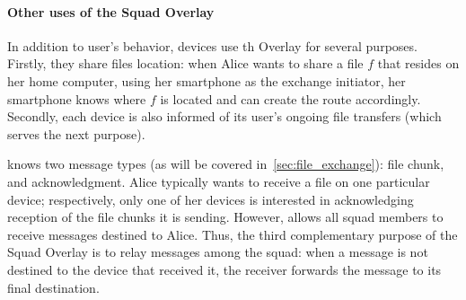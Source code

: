 


\paragraph*{Other uses of the Squad Overlay} In addition to user's behavior, devices use th \squad Overlay for several purposes. Firstly, they share files location: when Alice wants to share a file $f$ that resides on her home computer, using her smartphone as the exchange initiator, her smartphone knows where $f$ is located and can create the route accordingly. 
Secondly, each device is also informed of its user's ongoing file transfers (which serves the next purpose).

\name knows two message types (as will be covered in~\ref{sec:file_exchange}): file chunk, and acknowledgment.
Alice typically wants to receive a file on one particular device; respectively, only one of her devices is interested in acknowledging reception of the file chunks it is sending. 
However, \name allows all squad members to receive messages destined to Alice.
Thus, the third complementary purpose of the Squad Overlay is to relay messages among the squad: when a message is not destined to the device that received it, the receiver forwards the message to its final destination.

